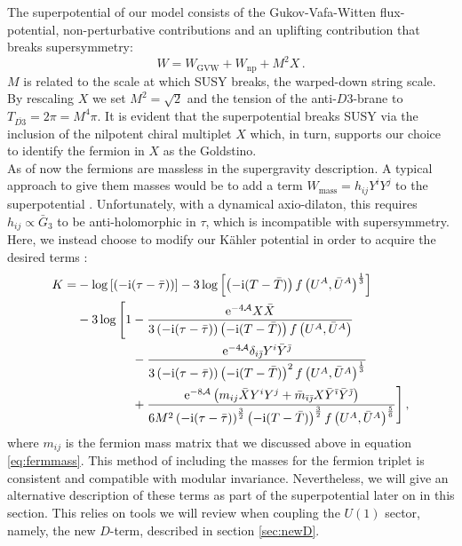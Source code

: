 \documentclass[a4paper,12pt,twoside,openright]{report}
\newcommand{\be}{\begin{equation}}
\newcommand{\ee}{\end{equation}}
\newcommand{\bea}{\begin{equation}\begin{aligned}}
\newcommand{\eea}{\end{aligned}\end{equation}}
\def\rmi{{\rm i}}
\def\rme{{\rm e}}
\def\ib{{\bar \imath}}
\def\jb{{\bar \jmath}}
\begin{document}
The superpotential of our model consists of the Gukov-Vafa-Witten flux-potential, non-perturbative contributions and an uplifting contribution that breaks supersymmetry:
\be 
W = W_{\text{GVW}} + W_{\text{np}} + M^2 X\,.
\label{eq:D3barsup}
\ee
$M$ is related to the scale at which SUSY breaks, the warped-down string scale. By rescaling $X$ we set $M^2 = \sqrt{2}$ and the tension of the anti-$D3$-brane to $T_{\overline{D3}} = 2 \pi = M^4 \pi$. It is evident that the superpotential breaks SUSY via the inclusion of the nilpotent chiral multiplet $X$ which, in turn, supports our choice to identify the fermion in $X$ as the Goldstino.\\
As of now the fermions are massless in the supergravity description. A typical approach to give them masses would be to add a term $W_{\text{mass}} = h_{ij}Y^i Y^j$ to the superpotential \cite{Vercnocke:2016fbt,GarciadelMoral:2017vnz}. Unfortunately, with a dynamical axio-dilaton, this requires $h_{ij}\propto \bar{G}_3$ to be anti-holomorphic in $\tau$, which is incompatible with supersymmetry. Here, we instead choose to modify our Kähler potential in order to acquire the desired terms :
\bea 
K = &- \log\left[\left(-\rmi(\tau-\bar{\tau})\right)\right] - 3 \log\left[\left(-\rmi(T-\bar{T})\right)f\left(U^A,\bar{U}^A\right)^{\frac{1}{3}}\right]\\
&- 3\log \Bigg[ 1- \frac{\rme^{-4\mathcal{A}} X\bar{X}}{3\left(-\rmi (\tau-\bar{\tau})\right)\left(-\rmi(T-\bar{T})\right)f\left(U^A,\bar{U}^A\right)}\\
&\qquad \qquad \;\,  - \frac{\rme^{-4\mathcal{A}}\delta_{i\jb}Y^i \bar{Y}^\jb}{3\left(-\rmi (\tau-\bar{\tau})\right)\left(-\rmi(T-\bar{T})\right)^2 f\left(U^A,\bar{U}^A\right)^{\frac{1}{3}}}\\
&\qquad \qquad \;\,  +\frac{\rme^{-8\mathcal{A}}\left( m_{ij} \bar{X} Y^i Y^j + \bar{m}_{\ib\jb}X \bar{Y}^\ib\bar{Y}^\jb\right)}{6 M^2 \left(-\rmi (\tau-\bar{\tau})\right)^\frac{3}{2} \left(-\rmi(T-\bar{T})\right)^{\frac{3}{2}} f\left(U^A,\bar{U}^A\right)^{\frac{5}{6}}}    \Bigg]\,,
\label{eq:Kferm}
\eea
where $m_{ij}$ is the fermion mass matrix that we discussed above in equation \eqref{eq:fermmass}. This method of including the masses for the fermion triplet is consistent and compatible with modular invariance. Nevertheless, we will give an alternative description of these terms as part of the superpotential later on in this section. This relies on tools we will review when coupling the $U(1)$ sector, namely, the new $D$-term, described in section \ref{sec:newD}.
\end{document}

